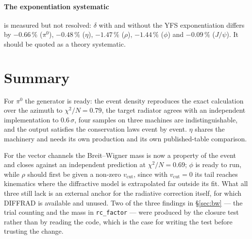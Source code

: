 \documentclass[11pt]{article}
\newcommand{\vcut}{v_{\mathrm{cut}}}
\newcommand{\code}[1]{\texttt{#1}}
\begin{document}
\paragraph{The exponentiation systematic} is measured but not resolved:
$\delta$ with and without the YFS exponentiation differs by $-0.66\,\%$
($\pi^0$), $-0.48\,\%$ ($\eta$), $-1.47\,\%$ ($\rho$), $-1.44\,\%$ ($\phi$)
and $-0.09\,\%$ ($J/\psi$). It should be quoted as a theory systematic.

\section{Summary}

For $\pi^0$ the generator is ready: the event density reproduces the exact
calculation over the azimuth to $\chi^2/N=0.79$, the target radiator agrees
with an independent implementation to $0.6\,\sigma$, four samples on three
machines are indistinguishable, and the output satisfies the conservation
laws event by event. $\eta$ shares the machinery and needs its own production
and its own published-table comparison.

For the vector channels the Breit--Wigner mass is now a property of the
event and closes against an independent prediction at $\chi^2/N=0.69$; $\phi$
is ready to run, while $\rho$ should first be given a non-zero $\vcut$, since
with $\vcut=0$ its tail reaches kinematics where the diffractive model is
extrapolated far outside its fit. What all three still lack is an external
anchor for the radiative correction itself, for which DIFFRAD is available
and unused. Two of the three findings in §\ref{sec:bw} --- the trial
counting and the mass in \code{rc\_factor} --- were produced by the closure
test rather than by reading the code, which is the case for writing the test
before trusting the change.
\end{document}
